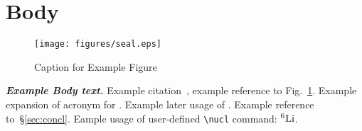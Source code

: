 \section{\label{sec:body}Body}

\begin{figure}[ht]
  \centering
  \texttt{[image: figures/seal.eps]}
  \caption{Caption for Example Figure}
  \label{fig:exmp}
\end{figure}

\emph{\textbf{Example Body text.}}
Example citation~\cite{Apollonio:1999jg}, example reference to Fig.~\ref{fig:exmp}.
Example expansion of acronym for \ke.
Example later usage of \ke.
Example reference to~\S\ref{sec:concl}.
Eample usage of user-defined \texttt{\textbackslash nucl} command: ${}^{6}\mbox{Li}$.
\\

\lipsum[4-8]
